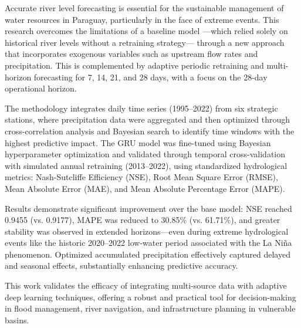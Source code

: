 \clearpage %
Accurate river level forecasting is essential for the sustainable management of water resources in Paraguay, particularly in the face of extreme events. This research overcomes the limitations of a baseline model —which relied solely on historical river levels without a retraining strategy— through a new approach that incorporates exogenous variables such as upstream flow rates and precipitation. This is complemented by adaptive periodic retraining and multi-horizon forecasting for 7, 14, 21, and 28 days, with a focus on the 28-day operational horizon.

The methodology integrates daily time series (1995–2022) from six strategic stations, where precipitation data were aggregated and then optimized through cross-correlation analysis and Bayesian search to identify time windows with the highest predictive impact. The GRU model was fine-tuned using Bayesian hyperparameter optimization and validated through temporal cross-validation with simulated annual retraining (2013–2022), using standardized hydrological metrics: Nash-Sutcliffe Efficiency (NSE), Root Mean Square Error (RMSE), Mean Absolute Error (MAE), and Mean Absolute Percentage Error (MAPE).


Results demonstrate significant improvement over the base model: NSE reached 0.9455 (vs. 0.9177), MAPE was reduced to 30.85\% (vs. 61.71\%), and greater stability was observed in extended horizons—even during extreme hydrological events like the historic 2020–2022 low-water period associated with the La Niña phenomenon. Optimized accumulated precipitation effectively captured delayed and seasonal effects, substantially enhancing predictive accuracy.

This work validates the efficacy of integrating multi-source data with adaptive deep learning techniques, offering a robust and practical tool for decision-making in flood management, river navigation, and infrastructure planning in vulnerable basins.